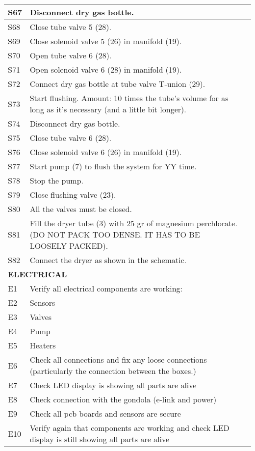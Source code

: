 \begin{longtable} {|m{}|m{}|m{}|}
\hline
S67 & Disconnect dry gas bottle. & \\
\hline
S68 & Close tube valve 5 (28). & \\
\hline
S69 & Close solenoid valve 5 (26) in manifold (19). & \\
\hline
S70 & Open tube valve 6 (28). & \\
\hline
S71 & Open solenoid valve 6 (28) in manifold (19). & \\
\hline
S72 & Connect dry gas bottle at tube valve T-union (29). & \\
\hline
S73 & Start flushing. Amount: 10 times the tube's volume for as long as it's necessary (and a little bit longer). & \\
\hline
S74 & Disconnect dry gas bottle. & \\
\hline
S75 & Close tube valve 6 (28). & \\
\hline
S76 & Close solenoid valve 6 (26) in manifold (19). & \\
\hline
S77 & Start pump (7) to flush the system for YY time. & \\
\hline
S78 & Stop the pump. & \\
\hline
S79 & Close flushing valve (23). & \\
\hline
S80 & All the valves must be closed. & \\
\hline
S81 & Fill the dryer tube (3) with 25 gr of magnesium perchlorate. (DO NOT PACK TOO DENSE. IT HAS TO BE LOOSELY PACKED). & \\
\hline
S82 & Connect the dryer as shown in the schematic. & \\
\hline
\multicolumn{2}{|l|}{ \textbf{ELECTRICAL} } & \\
\hline
E1 & Verify all electrical components are working: & \\
\hline
E2 & Sensors & \\
\hline
E3 & Valves & \\
\hline
E4 & Pump & \\
\hline
E5 & Heaters & \\
\hline
E6 & Check all connections and fix any loose connections (particularly the connection between the boxes.) & \\
\hline
E7 & Check LED display is showing all parts are alive & \\
\hline
E8 & Check connection with the gondola (e-link and power) & \\
\hline
E9 & Check all pcb boards and sensors are secure & \\
\hline
E10 & Verify again that components are working and check LED display is still showing all parts are alive & \\

\end{longtable}
